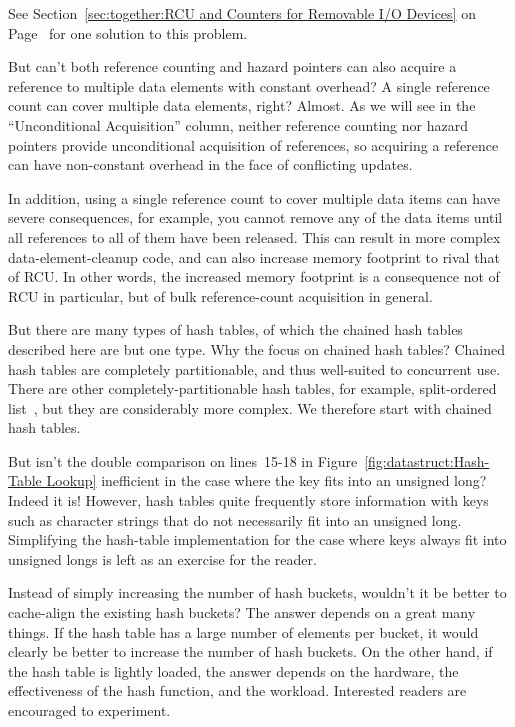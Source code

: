 \begin{enumerate}
	See
	Section~\ref{sec:together:RCU and Counters for Removable I/O Devices}
	on
	Page~\pageref{sec:together:RCU and Counters for Removable I/O Devices}
	for one solution to this problem.

\QuickQ{}
	But can't both reference counting and hazard pointers can also acquire
	a reference to multiple data elements with constant overhead?
	A single reference count can cover multiple data elements, right?
\QuickA{}
	Almost.
	As we will see in the ``Unconditional Acquisition'' column,
	neither reference counting
	nor hazard pointers provide unconditional acquisition of references,
	so acquiring a reference can have non-constant overhead in the face
	of conflicting updates.

	In addition, using a single reference count to cover multiple
	data items can have severe consequences, for example, you cannot
	remove any of the data items until all references to all of them
	have been released.
	This can result in more complex data-element-cleanup code,
	and can also increase memory footprint to rival that of RCU.
	In other words, the increased memory footprint is a consequence
	not of RCU in particular, but of bulk reference-count acquisition
	in general.

\QuickQ{}
	But there are many types of hash tables, of which the chained
	hash tables described here are but one type.
	Why the focus on chained hash tables?
\QuickA{}
	Chained hash tables are completely partitionable, and thus
	well-suited to concurrent use.
	There are other completely-partitionable hash tables, for
	example, split-ordered list~\cite{OriShalev2006SplitOrderListHash},
	but they are considerably more complex.
	We therefore start with chained hash tables.

\QuickQ{}
	But isn't the double comparison on lines~15-18 in
	Figure~\ref{fig:datastruct:Hash-Table Lookup} inefficient
	in the case where the key fits into an unsigned long?
\QuickA{}
	Indeed it is!
	However, hash tables quite frequently store information with
	keys such as character strings that do not necessarily fit
	into an unsigned long.
	Simplifying the hash-table implementation for the case where
	keys always fit into unsigned longs is left as an exercise
	for the reader.

\QuickQ{}
	Instead of simply increasing the number of hash buckets,
	wouldn't it be better to cache-align the existing hash buckets?
\QuickA{}
	The answer depends on a great many things.
	If the hash table has a large number of elements per bucket, it
	would clearly be better to increase the number of hash buckets.
	On the other hand, if the hash table is lightly loaded,
	the answer depends on the hardware, the effectiveness of the
	hash function, and the workload.
	Interested readers are encouraged to experiment.


\end{enumerate}
